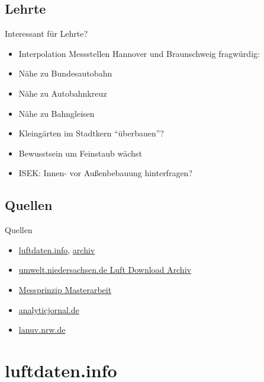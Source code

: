\documentclass[aspectratio=169]{beamer} %
\begin{document}
\subsection*{Lehrte}
\begin{frame}{Interessant für Lehrte?}
  \begin{itemize}
  \item Interpolation Messstellen Hannover und Braunschweig fragwürdig:
  \item Nähe zu Bundesautobahn
  \item Nähe zu Autobahnkreuz
  \item Nähe zu Bahngleisen
  \item Kleingärten im Stadtkern ``überbauen''?
  \item Bewusstsein um Feinstaub wächst
  \item ISEK: Innen- vor Außenbebauung hinterfragen?
  \end{itemize}
\end{frame}

\subsection{Quellen}
\begin{frame}{Quellen}
  \begin{itemize}
  \item \href{http://luftdaten.info/}{luftdaten.info}, \href{https://archive.luftdaten.info/}{archiv}
  \item \href{https://www.umwelt.niedersachsen.de/themen/luft/luen/aktuelle_messwerte/archiv/download/}{umwelt.niedersachsen.de Luft Download Archiv}
  \item \href{www.bund-neckar-alb.de/fileadmin/rv_neckar-alb/MasterarbeitBlonFeinstaubmessungimVergleich2017.pdf}{Messprinzip Masterarbeit}
  \item \href{www.analyticjournal.de/fachreports/grimm_nano_tubln_07_09/grimm_nano_pesch.pdf}{analyticjornal.de}
  \item \href{https://www.lanuv.nrw.de/fileadmin/lanuv/gesundheit/schadstoffe/gesundheitliche_wirkungen.pdf}{lanuv.nrw.de}
  \end{itemize}
\end{frame}

\section{luftdaten.info}
\end{document}
